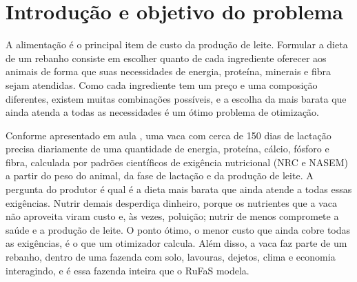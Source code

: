 \documentclass[a4paper,12pt]{article}
\begin{document}
\maketitle
\thispagestyle{primeira}
\newpage

\begin{abstract}
O presente documento descreve os procedimentos adotados para formular, por programação linear, a dieta de custo mínimo das vacas em lactação da fazenda sintética Campo Dourado, situada em Goiás, e para avaliar o efeito dessa dieta com o simulador de fazendas leiteiras RuFaS (\textit{Ruminant Farm Systems}). As exigências nutricionais dos animais foram obtidas do próprio simulador, segundo o padrão NASEM (2021), e os preços dos ingredientes foram levantados no mercado brasileiro. O modelo linear reproduz as restrições do otimizador de ração do RuFaS e foi resolvido para um custo de R\$ 24,31 por vaca por dia. A dieta do programa linear foi então simulada no RuFaS para verificar seus efeitos sobre a produção de leite e a emissão de metano.
\end{abstract}

\newpage

\newpage
\section{Introdução e objetivo do problema}\label{sec:introducao}

A alimentação é o principal item de custo da produção de leite. Formular a dieta de um rebanho consiste em escolher quanto de cada ingrediente oferecer aos animais de forma que suas necessidades de energia, proteína, minerais e fibra sejam atendidas. Como cada ingrediente tem um preço e uma composição diferentes, existem muitas combinações possíveis, e a escolha da mais barata que ainda atenda a todas as necessidades é um ótimo problema de otimização.

Conforme apresentado em aula \cite{slides:rufas}, uma vaca com cerca de 150 dias de lactação precisa diariamente de uma quantidade de energia, proteína, cálcio, fósforo e fibra, calculada por padrões científicos de exigência nutricional (NRC e NASEM) a partir do peso do animal, da fase de lactação e da produção de leite. A pergunta do produtor é qual é a dieta mais barata que ainda atende a todas essas exigências. Nutrir demais desperdiça dinheiro, porque os nutrientes que a vaca não aproveita viram custo e, às vezes, poluição; nutrir de menos compromete a saúde e a produção de leite. O ponto ótimo, o menor custo que ainda cobre todas as exigências, é o que um otimizador calcula. Além disso, a vaca faz parte de um rebanho, dentro de uma fazenda com solo, lavouras, dejetos, clima e economia interagindo, e é essa fazenda inteira que o RuFaS modela.
\end{document}
